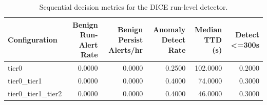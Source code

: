 \begin{table}[t]
\centering
\caption{Sequential decision metrics for the DICE run-level detector.}
\label{tab:dice_sequential_metrics}
\footnotesize
\begin{tabular}{lrrrrr}
\toprule
Configuration & Benign Run-Alert Rate & Benign Persist Alerts/hr & Anomaly Detect Rate & Median TTD (s) & Detect <=300s \\
\midrule
tier0 & 0.0000 & 0.0000 & 0.2500 & 102.0000 & 0.2000 \\
tier0_tier1 & 0.0000 & 0.0000 & 0.4000 & 74.0000 & 0.3000 \\
tier0_tier1_tier2 & 0.0000 & 0.0000 & 0.4000 & 46.0000 & 0.3000 \\
\bottomrule
\end{tabular}

\end{table}
